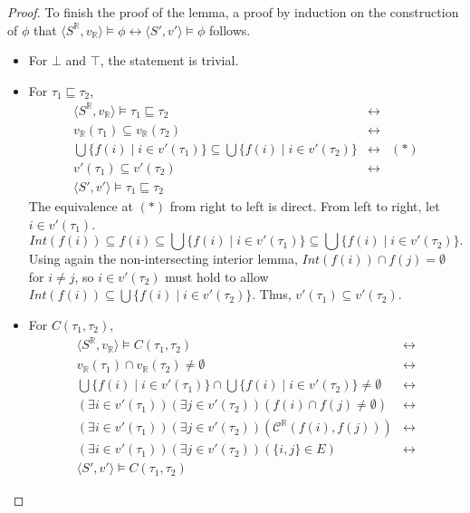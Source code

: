 \documentclass{article}
\newcommand{\R}{\mathbb{R}}
\newcommand{\bcont}{\mathcal{C}^\R}
\newcommand{\lpart}{\sqsubseteq}
\newcommand{\lcont}{C}
\begin{document}
\begin{proof}
    To finish the proof of the lemma, a proof by induction on the construction of $\phi$ that $\langle S^\R, v_\R \rangle \models \phi \leftrightarrow \langle S', v' \rangle \models \phi$ follows.
    \begin{itemize}
    \item For $\bot$ and $\top$, the statement is trivial.
    \item For $\tau_1 \lpart \tau_2$,
      \begin{align*}
        \langle S^\R, v_\R \rangle \models \tau_1 \lpart \tau_2 &\leftrightarrow \\
        v_\R(\tau_1) \subseteq v_\R(\tau_2) &\leftrightarrow \\
        \bigcup\{f(i) \mid i \in v'(\tau_1)\} \subseteq \bigcup\{f(i) \mid i \in v'(\tau_2)\} &\leftrightarrow & (*) \\
        v'(\tau_1) \subseteq v'(\tau_2) &\leftrightarrow \\
        \langle S', v' \rangle \models \tau_1 \lpart \tau_2
      \end{align*}
      The equivalence at $(*)$ from right to left is direct. From left to right, let $i \in v'(\tau_1)$. \[Int(f(i)) \subseteq f(i) \subseteq \bigcup\{f(i) \mid i \in v'(\tau_1)\} \subseteq \bigcup\{f(i) \mid i \in v'(\tau_2)\}.\] Using again the non-intersecting interior lemma, $Int(f(i)) \cap f(j) = \emptyset$ for $i \neq j$, so $i \in v'(\tau_2)$ must hold to allow $Int(f(i)) \subseteq \bigcup\{f(i) \mid i \in v'(\tau_2)\}$. Thus, $v'(\tau_1) \subseteq v'(\tau_2)$.
    \item For $\lcont(\tau_1, \tau_2)$,
      \begin{align*}
        \langle S^\R, v_\R \rangle \models \lcont(\tau_1, \tau_2) &\leftrightarrow \\
        v_\R(\tau_1) \cap v_\R(\tau_2) \neq \emptyset &\leftrightarrow \\
        \bigcup\{f(i) \mid i \in v'(\tau_1)\} \cap \bigcup\{f(i) \mid i \in v'(\tau_2)\} \neq \emptyset &\leftrightarrow \\
        (\exists i \in v'(\tau_1))(\exists j \in v'(\tau_2))(f(i) \cap f(j) \neq \emptyset) &\leftrightarrow \\
        (\exists i \in v'(\tau_1))(\exists j \in v'(\tau_2))(\bcont(f(i), f(j))) &\leftrightarrow \\
        (\exists i \in v'(\tau_1))(\exists j \in v'(\tau_2))(\{i, j\} \in E) &\leftrightarrow \\
        \langle S', v' \rangle \models \lcont(\tau_1, \tau_2)

\end{align*}
\end{itemize}
\end{proof}
\end{document}
